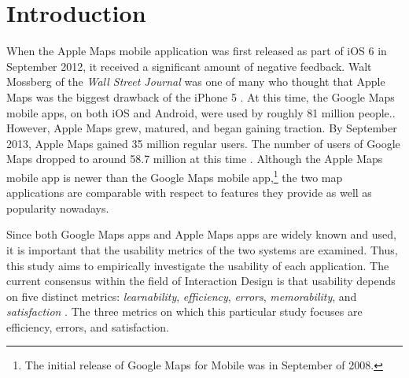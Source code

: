 \documentclass[a4paper; 11pt]{article}
\begin{document}
\section{Introduction}
When the Apple Maps mobile application was first released as part of iOS 6 in September 2012, it received a significant amount of negative feedback. Walt Mossberg of the \textit{Wall Street Journal} was one of many who thought that Apple Maps was the biggest drawback of the iPhone 5 \cite{Mossberg}. At this time, the Google Maps mobile apps, on both iOS and Android, were used by roughly 81 million people.\cite{ComScore}. However, Apple Maps grew, matured, and began gaining traction. By September 2013, Apple Maps gained 35 million regular users. The number of users of Google Maps dropped to around 58.7 million at this time \cite{ComScore}. Although the Apple Maps mobile app is newer than the Google Maps mobile app,\footnote{The initial release of Google Maps for Mobile was in September of 2008.} the two map applications are comparable with respect to features they provide as well as popularity nowadays.

\medskip %
\par     %
Since both Google Maps apps and Apple Maps apps are widely known and used, it is important that the usability metrics of the two systems are examined. Thus, this study aims to empirically investigate the usability of each application. The current consensus within the field of Interaction Design is that usability depends on five distinct metrics: \textit{learnability}, \textit{efficiency}, \textit{errors}, \textit{memorability}, and \textit{satisfaction} \cite{Nielsen}. The three metrics on which this particular study focuses are efficiency, errors, and satisfaction.
\end{document}
